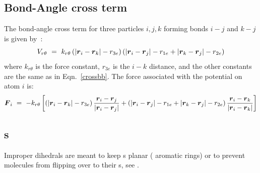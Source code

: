 \subsection{Bond-Angle cross term}
The bond-angle cross term for three particles $i, j, k$ forming bonds
$i-j$ and $k-j$ is given by~\cite{Lawrence2003a}:
\begin{equation}
V_{r\theta} ~=~ k_{r\theta} \left(\left|\mbox{\boldmath ${r}$}_{i}-\mbox{\boldmath ${r}$}_k\right|-r_{3e} \right) \left(\left|\mbox{\boldmath ${r}$}_{i}-\mbox{\boldmath ${r}$}_j\right|-r_{1e} + \left|\mbox{\boldmath ${r}$}_{k}-\mbox{\boldmath ${r}$}_j\right|-r_{2e}\right)
\end{equation}
where $k_{r\theta}$ is the force constant, $r_{3e}$ is the $i-k$ distance,
and the other constants are the same as in Eqn.~\ref{crossbb}. The force
associated with the potential on atom $i$ is:
\begin{equation}
\mbox{\boldmath ${F}$}_{i} ~=~ -k_{r\theta}\left[\left(\left|\mbox{\boldmath ${r}$}_{i}-\mbox{\boldmath ${r}$}_{k}\right|-r_{3e}\right)\frac{\mbox{\boldmath ${r}$}_i-\mbox{\boldmath ${r}$}_j}{\left|\mbox{\boldmath ${r}$}_{i}-\mbox{\boldmath ${r}$}_j\right|} \\
+ \left(\left|\mbox{\boldmath ${r}$}_{i}-\mbox{\boldmath ${r}$}_j\right|-r_{1e} + \left|\mbox{\boldmath ${r}$}_{k}-\mbox{\boldmath ${r}$}_j\right|-r_{2e}\right)\frac{\mbox{\boldmath ${r}$}_i-\mbox{\boldmath ${r}$}_k}{\left|\mbox{\boldmath ${r}$}_{i}-\mbox{\boldmath ${r}$}_k\right|}\right]
\end{equation}

\newcommand{\rvkj}{{\bf r}_{kj}}
\newcommand{\rkj}{r_{kj}}

\subsection{s}
Improper dihedrals are meant to keep s planar ({\eg} 
aromatic rings) or to prevent molecules from flipping over to their
s, see .

